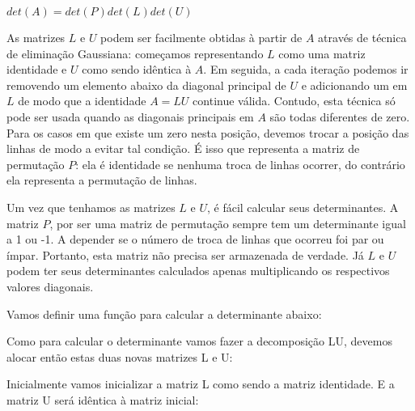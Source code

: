 $det(A) = det(P)det(L)det(U)$

As matrizes $L$ e $U$ podem ser facilmente obtidas à partir de $A$
através de técnica de eliminação Gaussiana: começamos representando
$L$ como uma matriz identidade e $U$ como sendo idêntica à $A$. Em
seguida, a cada iteração podemos ir removendo um elemento abaixo da
diagonal principal de $U$ e adicionando um em $L$ de modo que a
identidade $A=LU$ continue válida. Contudo, esta técnica só pode ser
usada quando as diagonais principais em $A$ são todas diferentes de
zero. Para os casos em que existe um zero nesta posição, devemos
trocar a posição das linhas de modo a evitar tal condição. É isso que
representa a matriz de permutação $P$: ela é identidade se nenhuma
troca de linhas ocorrer, do contrário ela representa a permutação de
linhas.

Um vez que tenhamos as matrizes $L$ e $U$, é fácil calcular seus
determinantes. A matriz $P$, por ser uma matriz de permutação sempre
tem um determinante igual a 1 ou -1. A depender se o número de troca
de linhas que ocorreu foi par ou ímpar. Portanto, esta matriz não
precisa ser armazenada de verdade. Já $L$ e $U$ podem ter seus
determinantes calculados apenas multiplicando os respectivos valores
diagonais.

Vamos definir uma função para calcular a determinante abaixo:


Como para calcular o determinante vamos fazer a decomposição LU,
devemos alocar então estas duas novas matrizes L e U:


Inicialmente vamos inicializar a matriz L como sendo a matriz
identidade. E a matriz U será idêntica à matriz inicial:


